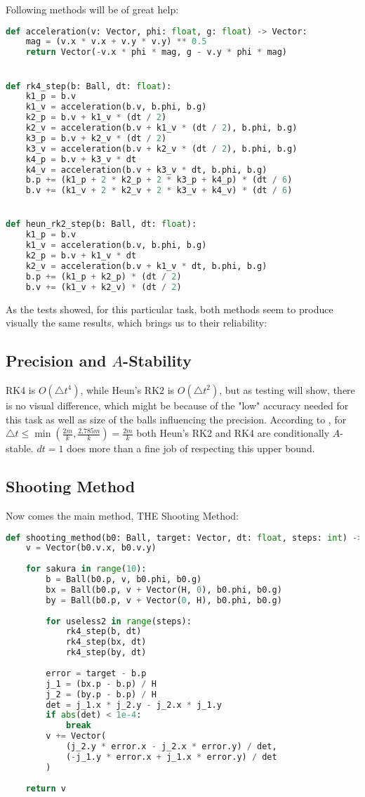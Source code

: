 \documentclass{article}
\begin{document}
	Following methods will be of great help:
	\begin{lstlisting}[language=python]
def acceleration(v: Vector, phi: float, g: float) -> Vector:
	mag = (v.x * v.x + v.y * v.y) ** 0.5
	return Vector(-v.x * phi * mag, g - v.y * phi * mag)


def rk4_step(b: Ball, dt: float):
	k1_p = b.v
	k1_v = acceleration(b.v, b.phi, b.g)
	k2_p = b.v + k1_v * (dt / 2)
	k2_v = acceleration(b.v + k1_v * (dt / 2), b.phi, b.g)
	k3_p = b.v + k2_v * (dt / 2)
	k3_v = acceleration(b.v + k2_v * (dt / 2), b.phi, b.g)
	k4_p = b.v + k3_v * dt
	k4_v = acceleration(b.v + k3_v * dt, b.phi, b.g)
	b.p += (k1_p + 2 * k2_p + 2 * k3_p + k4_p) * (dt / 6)
	b.v += (k1_v + 2 * k2_v + 2 * k3_v + k4_v) * (dt / 6)


def heun_rk2_step(b: Ball, dt: float):
	k1_p = b.v
	k1_v = acceleration(b.v, b.phi, b.g)
	k2_p = b.v + k1_v * dt
	k2_v = acceleration(b.v + k1_v * dt, b.phi, b.g)
	b.p += (k1_p + k2_p) * (dt / 2)
	b.v += (k1_v + k2_v) * (dt / 2)\end{lstlisting}
	
	As the tests showed, for this particular task, both methods seem to produce visually the same results, which brings us to their reliability:
	
	\subsection*{Precision and $A$-Stability}
	
	RK4 is $O(\triangle t^4)$, while Heun's RK2 is $O(\triangle t^2)$, but as testing will show, there is no visual difference, which might be because of the "low" accuracy needed for this task as well as size of the balls influencing the precision. According to \cite{Astab}, for $\triangle t \leq \min (\frac{2m}{k}, \frac{2.785m}{k}) = \frac{2m}{k}$ both Heun's RK2 and RK4 are conditionally $A$-stable. $dt = 1$ does more than a fine job of respecting this upper bound. \\
	
	\subsection*{Shooting Method}
	Now comes the main method, THE Shooting Method: 
	
	\begin{lstlisting}[language=python]
def shooting_method(b0: Ball, target: Vector, dt: float, steps: int) -> Vector:
	v = Vector(b0.v.x, b0.v.y)
	
	for sakura in range(10):
		b = Ball(b0.p, v, b0.phi, b0.g)
		bx = Ball(b0.p, v + Vector(H, 0), b0.phi, b0.g)
		by = Ball(b0.p, v + Vector(0, H), b0.phi, b0.g)
		
		for useless2 in range(steps):
			rk4_step(b, dt)
			rk4_step(bx, dt)
			rk4_step(by, dt)
		
		error = target - b.p
		j_1 = (bx.p - b.p) / H
		j_2 = (by.p - b.p) / H
		det = j_1.x * j_2.y - j_2.x * j_1.y
		if abs(det) < 1e-4:
			break
		v += Vector(
			(j_2.y * error.x - j_2.x * error.y) / det, 
			(-j_1.y * error.x + j_1.x * error.y) / det
		)
	
	return v	
	\end{lstlisting}
	
\end{document}
